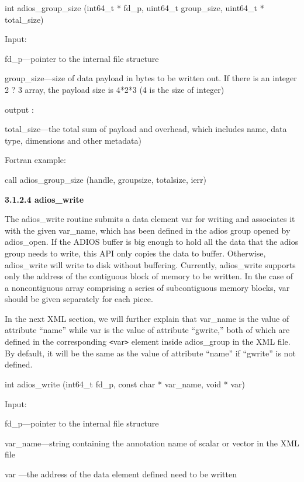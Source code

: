 \leftskip=22pt
int adios\_group\_size (int64\_t * fd\_p, uint64\_t group\_size, uint64\_t * total\_size)

Input: 

\leftskip=40pt
fd\_p---pointer to the internal file structure

group\_size---size of data payload in bytes to be written out. If there is an integer 
2 ? 3 array, the payload size is 4*2*3 (4 is the size of integer)

output :

total\_size---the total sum of payload and overhead, which includes name, data 
type, dimensions and other metadata)

\leftskip=22pt
Fortran example: 

\leftskip=40pt
call adios\_group\_size (handle, groupsize, totalsize, ierr)

\leftskip=0pt
\textbf{3.1.2.4 adios\_write}

The adios\_write routine submits a data element var for writing and associates 
it with the given var\_name, which has been defined in the adios group opened by 
adios\_open. If the ADIOS buffer is big enough to hold all the data that the adios 
group needs to write, this API only copies the data to buffer. Otherwise, adios\_write 
will write to disk without buffering. Currently, adios\_write supports only the 
address of the contiguous block of memory to be written. In the case of a noncontiguous 
array comprising a series of subcontiguous memory blocks, var should be given separately 
for each piece.

In the next XML section, we will further explain that var\_name is the value of 
attribute ``name'' while var is the value of attribute ``gwrite,'' both of which 
are defined in the corresponding \texttt{<}var\texttt{>} element inside adios\_group 
in the XML file. By default, it will be the same as the value of attribute ``name'' 
if ``gwrite'' is not defined. 

\leftskip=22pt
int adios\_write (int64\_t fd\_p, const char * var\_name, void * var)

Input:

\leftskip=45pt
fd\_p---pointer to the internal file structure

\leftskip=117pt
\parindent=-72pt
var\_name---string containing the annotation name of scalar or vector in the XML 
file

\leftskip=45pt
\parindent=0pt
var ---the address of the data element defined need to be written

